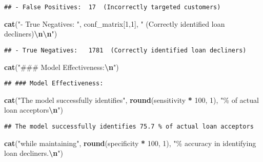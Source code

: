 \documentclass[
]{article}
\newenvironment{Shaded}{\begin{snugshade}}{\end{snugshade}}
\newcommand{\DecValTok}[1]{\textcolor[rgb]{0.00,0.00,0.81}{#1}}
\newcommand{\FunctionTok}[1]{\textcolor[rgb]{0.13,0.29,0.53}{\textbf{#1}}}
\newcommand{\NormalTok}[1]{#1}
\newcommand{\SpecialCharTok}[1]{\textcolor[rgb]{0.81,0.36,0.00}{\textbf{#1}}}
\newcommand{\StringTok}[1]{\textcolor[rgb]{0.31,0.60,0.02}{#1}}
\begin{document}
\begin{verbatim}
## - False Positives:  17  (Incorrectly targeted customers)
\end{verbatim}

\begin{Shaded}
\begin{Highlighting}[]
\FunctionTok{cat}\NormalTok{(}\StringTok{"{-} True Negatives:  "}\NormalTok{, conf\_matrix[}\DecValTok{1}\NormalTok{,}\DecValTok{1}\NormalTok{], }\StringTok{" (Correctly identified loan decliners)}\SpecialCharTok{\textbackslash{}n\textbackslash{}n}\StringTok{"}\NormalTok{)}
\end{Highlighting}
\end{Shaded}

\begin{verbatim}
## - True Negatives:   1781  (Correctly identified loan decliners)
\end{verbatim}

\begin{Shaded}
\begin{Highlighting}[]
\FunctionTok{cat}\NormalTok{(}\StringTok{"\#\#\# Model Effectiveness:}\SpecialCharTok{\textbackslash{}n}\StringTok{"}\NormalTok{)}
\end{Highlighting}
\end{Shaded}

\begin{verbatim}
## ### Model Effectiveness:
\end{verbatim}

\begin{Shaded}
\begin{Highlighting}[]
\FunctionTok{cat}\NormalTok{(}\StringTok{"The model successfully identifies"}\NormalTok{, }\FunctionTok{round}\NormalTok{(sensitivity }\SpecialCharTok{*} \DecValTok{100}\NormalTok{, }\DecValTok{1}\NormalTok{), }\StringTok{"\% of actual loan acceptors}\SpecialCharTok{\textbackslash{}n}\StringTok{"}\NormalTok{)}
\end{Highlighting}
\end{Shaded}

\begin{verbatim}
## The model successfully identifies 75.7 % of actual loan acceptors
\end{verbatim}

\begin{Shaded}
\begin{Highlighting}[]
\FunctionTok{cat}\NormalTok{(}\StringTok{"while maintaining"}\NormalTok{, }\FunctionTok{round}\NormalTok{(specificity }\SpecialCharTok{*} \DecValTok{100}\NormalTok{, }\DecValTok{1}\NormalTok{), }\StringTok{"\% accuracy in identifying loan decliners.}\SpecialCharTok{\textbackslash{}n}\StringTok{"}\NormalTok{)}
\end{Highlighting}
\end{Shaded}
\end{document}
